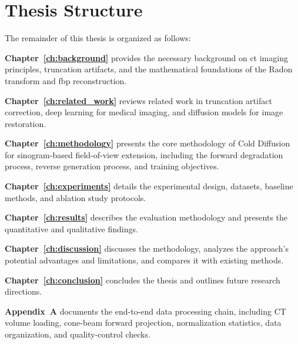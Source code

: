 \section{Thesis Structure}

The remainder of this thesis is organized as follows:

\textbf{Chapter~\ref{ch:background}} provides the necessary background on \gls{ct} imaging principles, truncation artifacts, and the mathematical foundations of the Radon transform and \gls{fbp} reconstruction.

\textbf{Chapter~\ref{ch:related_work}} reviews related work in truncation artifact correction, deep learning for medical imaging, and diffusion models for image restoration.

\textbf{Chapter~\ref{ch:methodology}} presents the core methodology of Cold Diffusion for sinogram-based field-of-view extension, including the forward degradation process, reverse generation process, and training objectives.

\textbf{Chapter~\ref{ch:experiments}} details the experimental design, datasets, baseline methods, and ablation study protocols.

\textbf{Chapter~\ref{ch:results}} describes the evaluation methodology and presents the quantitative and qualitative findings.

\textbf{Chapter~\ref{ch:discussion}} discusses the methodology, analyzes the approach's potential advantages and limitations, and compares it with existing methods.

\textbf{Chapter~\ref{ch:conclusion}} concludes the thesis and outlines future research directions.

\textbf{Appendix~A} documents the end-to-end data processing chain, including CT volume loading, cone-beam forward projection, normalization statistics, data organization, and quality-control checks.

